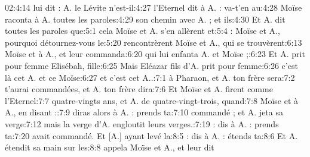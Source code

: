\begin{multicols}{3}

{\fontsize{7pt}{0.5em}\selectfont

02:4:14	lui dit : A. le Lévite n'est-il:4:27	l'Eternel dit à A. : va-t'en au:4:28	Moïse raconta à A. toutes les paroles:4:29	son chemin avec A. ; et ils:4:30	Et A. dit toutes les paroles que:5:1	cela Moïse et A. s'en allèrent et:5:4	: Moïse et A., pourquoi détournez-vous le:5:20	rencontrèrent Moïse et A., qui se trouvèrent:6:13	Moïse et à A., et leur commanda:6:20	qui lui enfanta A. et Moïse ;:6:23	Et A. prit pour femme Elisébah, fille:6:25	Mais Eléazar fils d'A. prit pour femme:6:26	c'est là cet A. et ce Moïse:6:27	et c'est cet A..:7:1	à Pharaon, et A. ton frère sera:7:2	t'aurai commandées, et A. ton frère dira:7:6	Et Moïse et A. firent comme l'Eternel:7:7	quatre-vingts ans, et A. de quatre-vingt-trois, quand:7:8	Moïse et à A., en disant ::7:9	diras alors à A. : prends ta:7:10	commandé ; et A. jeta sa verge:7:12	mais la verge d'A. engloutit leurs verges.:7:19	: dis à A. : prends ta:7:20	avait commandé. Et [A.] ayant levé la:8:5	: dis à A. : étends ta:8:6	Et A. étendit sa main sur les:8:8	appela Moïse et A., et leur dit\newline
}
\end{multicols}
